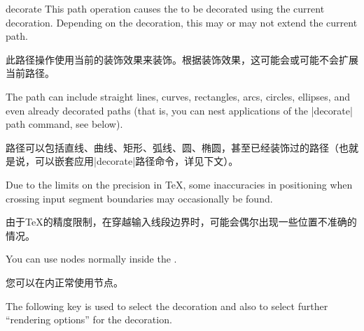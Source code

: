 \begin{pathoperation}{decorate}{}
    This path operation causes the  to be decorated using the
    current decoration. Depending on the decoration, this may or may not extend
    the current path.

    此路径操作使用当前的装饰效果来装饰。根据装饰效果，这可能会或可能不会扩展当前路径。

    \begin{codeexample}[preamble={\usetikzlibrary{decorations.pathmorphing}}]
\end{codeexample}
    The path can include straight lines, curves, rectangles, arcs, circles,
    ellipses, and even already decorated paths (that is, you can nest
    applications of the |decorate| path command, see below).

    路径可以包括直线、曲线、矩形、弧线、圆、椭圆，甚至已经装饰过的路径（也就是说，可以嵌套应用|decorate|路径命令，详见下文）。

    Due to the limits on the precision in  \TeX, some inaccuracies in
    positioning when crossing input segment boundaries may occasionally be
    found.

    由于\TeX 的精度限制，在穿越输入线段边界时，可能会偶尔出现一些位置不准确的情况。

    You can use nodes normally inside the .

    您可以在内正常使用节点。

\begin{codeexample}[preamble={\usetikzlibrary{
    decorations.pathmorphing,
    decorations.shapes,
}}]
\end{codeexample}

    The following key is used to select the decoration and also to select
    further ``rendering options'' for the decoration.


\end{pathoperation}
